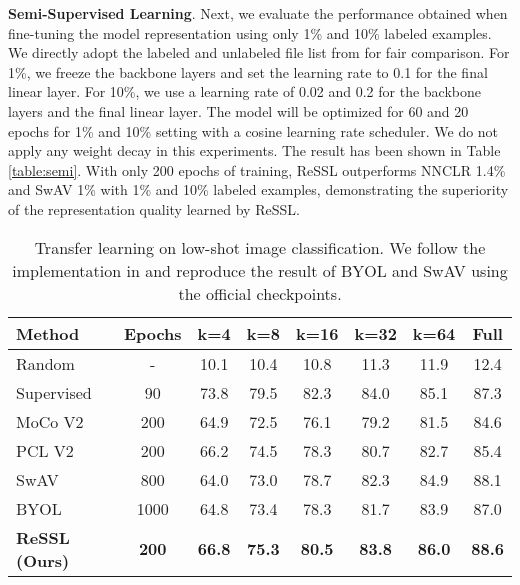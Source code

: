 \documentclass{article}
\newcommand{\<}{\left\langle}
\renewcommand{\>}{\right\rangle}
\begin{document}
\textbf{Semi-Supervised Learning}. 
Next, we evaluate the performance obtained when fine-tuning the model representation using only 1\% and 10\% labeled examples. We directly adopt the labeled and unlabeled file list from \cite{simclr} for fair comparison. For 1\%, we freeze the backbone layers and set the learning rate to 0.1 for the final linear layer. For 10\%, we use a learning rate of 0.02 and 0.2 for the backbone layers and the final linear layer. The model will be optimized for 60 and 20 epochs for 1\% and 10\% setting with a cosine learning rate scheduler. We do not apply any weight decay in this experiments. The result has been shown in Table \ref{table:semi}. With only 200 epochs of training, ReSSL outperforms NNCLR 1.4\% and SwAV 1\% with 1\% and 10\% labeled examples, demonstrating the superiority of the representation quality learned by ReSSL.






\renewcommand\arraystretch{1.0}
\begin{table}[h]
 \centering
 \setlength\tabcolsep{5pt}
 \vspace{-5pt}
 \caption{Transfer learning on low-shot image classification. We follow the implementation in \cite{PCL} and reproduce the result of BYOL and SwAV using the official checkpoints.}
 \vspace{-10pt}
 \label{table:low-shot}
\begin{tabular}{l  c  c c  c  c c c} 
\toprule 
Method & Epochs & k=4 & k=8 & k=16 & k=32 & k=64 & Full \\
\hline
Random     & -  & 10.1 & 10.4 & 10.8 & 11.3 & 11.9 & 12.4 \\
Supervised & 90 & 73.8 & 79.5 & 82.3 & 84.0 & 85.1 & 87.3 \\ \hline
MoCo V2 \cite{mocov2} & 200 & 64.9 & 72.5 & 76.1 & 79.2 & 81.5 & 84.6 \\
PCL V2 \cite{PCL} & 200 & 66.2 & 74.5 & 78.3 & 80.7 & 82.7 & 85.4 \\
SwAV \cite{swav}  & 800 & 64.0 & 73.0 & 78.7 & 82.3 & 84.9 & 88.1 \\
BYOL \cite{byol}  & 1000 & 64.8 & 73.4 & 78.3 & 81.7 & 83.9 & 87.0 \\
\textbf{ReSSL (Ours)}  & \textbf{200} & \textbf{66.8} & \textbf{75.3} & \textbf{80.5} & \textbf{83.8} & \textbf{86.0} & \textbf{88.6} \\
\bottomrule
\end{tabular}
\end{table}
\end{document}
